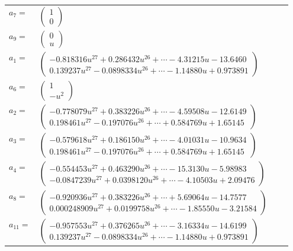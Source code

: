 \documentclass[1p]{elsarticle_modified}
\theoremstyle{definition}
\begin{document}
\begin{tabular}{m{7pt} m{180pt} m{7pt} m{180pt} }
\flushright $a_{7}=$&$\begin{pmatrix}1\\0\end{pmatrix}$ \\
\flushright $a_{9}=$&$\begin{pmatrix}0\\u\end{pmatrix}$ \\
\flushright $a_{1}=$&$\begin{pmatrix}-0.818316 u^{27}+0.286432 u^{26}+\cdots-4.31215 u-13.6460\\0.139237 u^{27}-0.0898334 u^{26}+\cdots-1.14880 u+0.973891\end{pmatrix}$ \\
\flushright $a_{6}=$&$\begin{pmatrix}1\\- u^2\end{pmatrix}$ \\
\flushright $a_{2}=$&$\begin{pmatrix}-0.778079 u^{27}+0.383226 u^{26}+\cdots-4.59508 u-12.6149\\0.198461 u^{27}-0.197076 u^{26}+\cdots+0.584769 u+1.65145\end{pmatrix}$ \\
\flushright $a_{3}=$&$\begin{pmatrix}-0.579618 u^{27}+0.186150 u^{26}+\cdots-4.01031 u-10.9634\\0.198461 u^{27}-0.197076 u^{26}+\cdots+0.584769 u+1.65145\end{pmatrix}$ \\
\flushright $a_{4}=$&$\begin{pmatrix}-0.554453 u^{27}+0.463290 u^{26}+\cdots-15.3130 u-5.98983\\-0.0847239 u^{27}+0.0398120 u^{26}+\cdots-4.10503 u+2.09476\end{pmatrix}$ \\
\flushright $a_{8}=$&$\begin{pmatrix}-0.920936 u^{27}+0.383226 u^{26}+\cdots+5.69064 u-14.7577\\0.000248909 u^{27}+0.0199758 u^{26}+\cdots-1.85550 u-3.21584\end{pmatrix}$ \\
\flushright $a_{11}=$&$\begin{pmatrix}-0.957553 u^{27}+0.376265 u^{26}+\cdots-3.16334 u-14.6199\\0.139237 u^{27}-0.0898334 u^{26}+\cdots-1.14880 u+0.973891\end{pmatrix}$ \\

\end{tabular}
\end{document}
